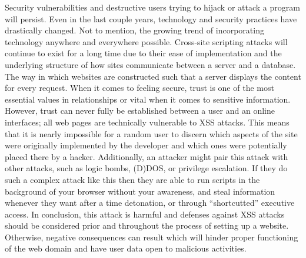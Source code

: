 \documentclass[conference]{IEEEtran}
\begin{document}
Security vulnerabilities and destructive users trying to hijack or attack a program will persist. Even in the last couple years, technology and security practices have drastically changed. Not to mention, the growing trend of incorporating technology anywhere and everywhere possible. Cross-site scripting attacks will continue to exist for a long time due to their ease of implementation and the underlying structure of how sites communicate between a server and a database. The way in which websites are constructed such that a server displays the content for every request. When it comes to feeling secure, trust is one of the most essential values in relationships or vital when it comes to sensitive information. However, trust can never fully be established between a user and an online interfaces; all web pages are technically vulnerable to XSS attacks. This means that it is nearly impossible for a random user to discern which aspects of the site were originally implemented by the developer and which ones were potentially placed there by a hacker. Additionally, an attacker might pair this attack with other attacks, such as logic bombs, (D)DOS, or privilege escalation.  If they do such a complex attack like this then they are able to run scripts in the background of your browser without your awareness, and steal information whenever they want after a time detonation, or through “shortcutted” executive access. In conclusion, this attack is harmful and defenses against XSS attacks should be considered prior and throughout the process of setting up a website. Otherwise, negative consequences can result which will hinder proper functioning of the web domain and have user data open to malicious activities.
\end{document}
